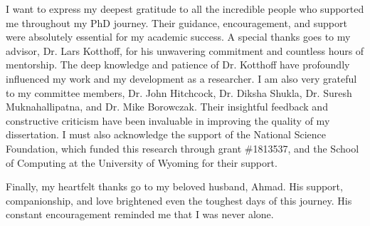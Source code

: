 \documentclass[12pt]{book}                  %
\begin{document}
\thesistitlepage        %
\thesiscopyrightpage    %
\thesisdedicationpage   %

\tableofcontents        %
\listoffigures          %
\listoftables           %


\begin{thesisacknowledgments}

I want to express my deepest gratitude to all the incredible people who supported me throughout my PhD journey. Their guidance, encouragement, and support were absolutely essential for my academic success. A special thanks goes to my advisor, Dr. Lars Kotthoff, for his unwavering commitment and countless hours of mentorship. The deep knowledge and patience of Dr. Kotthoff have profoundly influenced my work and my development as a researcher. I am also very grateful to my committee members, Dr. John Hitchcock, Dr. Diksha Shukla, Dr. Suresh Muknahallipatna, and Dr. Mike Borowczak. Their insightful feedback and constructive criticism have been invaluable in improving the quality of my dissertation. I must also acknowledge the support of the National Science Foundation, which funded this research through grant \#1813537, and the School of Computing at the University of Wyoming for their support.

Finally, my heartfelt thanks go to my beloved husband, Ahmad. His support, companionship, and love brightened even the toughest days of this journey. His constant encouragement reminded me that I was never alone.
\end{thesisacknowledgments}




\end{document}
